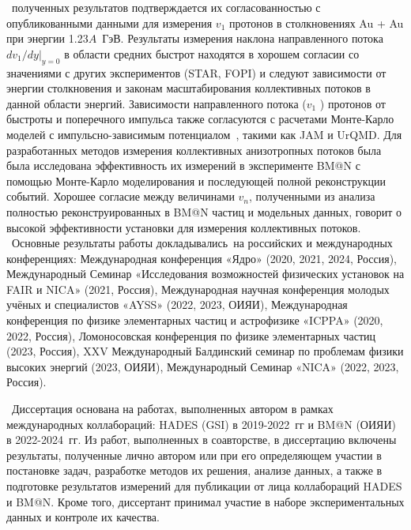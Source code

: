 \reliability\ полученных результатов подтверждается их согласованностью с опубликованными данными для измерения  $v_1$ протонов в столкновениях Au + Au при энергии 1.23$A$~ГэВ. 
Результаты измерения наклона направленного потока $dv_1/dy|_{y=0}$ в области средних быстрот находятся в хорошем согласии со значениями с других экспериментов (STAR, FOPI)  и следуют зависимости от энергии столкновения и законам масштабирования коллективных потоков в данной области энергий.
Зависимости направленного потока ($v_1$ ) протонов от быстроты и поперечного импульса также согласуются с расчетами Монте-Карло моделей с импульсно-зависимым потенциалом~\cite{nara2019jam}, такими как JAM и UrQMD.
Для разработанных методов измерения коллективных анизотропных потоков была была исследована эффективность их измерений в эксперименте BM@N с помощью Монте-Карло моделирования и последующей полной реконструкции событий.
Хорошее согласие между величинами  $v_n$,  полученными из анализа полностью реконструированных в BM@N частиц  и модельных данных, говорит о высокой эффективности установки для измерения коллективных потоков.\\

\probation\
Основные результаты работы докладывались~на российских и международных конференциях: 
Международная конференция «Ядро» (2020, 2021, 2024, Россия), 
Международный Семинар «Исследования возможностей физических установок на FAIR и NICA» (2021, Россия), 
Международная научная конференция молодых учёных и специалистов «AYSS» (2022, 2023, ОИЯИ), 
Международная конференция по физике элементарных частиц и астрофизике «ICPPA» (2020, 2022, Россия), 
Ломоносовская конференция по физике элементарных частиц (2023, Россия), 
XXV Международный Балдинский семинар по проблемам физики высоких энергий (2023, ОИЯИ), 
Международный Семинар «NICA» (2022, 2023, Россия).

\contribution\ Диссертация основана на работах, выполненных автором в рамках международных коллабораций: HADES (GSI) в 2019-2022~гг и BM@N (ОИЯИ) в 2022-2024~гг. 
Из работ, выполненных в соавторстве, в диссертацию включены результаты, полученные лично автором или при его определяющем участии в постановке задач, разработке методов их решения, анализе данных, а также в подготовке результатов измерений для публикации от лица коллабораций HADES и BM@N.
Кроме того, диссертант принимал участие в наборе экспериментальных данных и контроле их качества.

